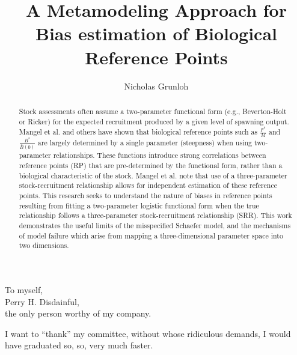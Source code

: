 \documentclass[12pt]{ucscthesis}
\title{A Metamodeling Approach for Bias estimation of Biological Reference Points}
\author{Nicholas Grunloh}
\begin{document}
%
\begin{frontmatter}

%
\maketitle
\copyrightpage
%
\tableofcontents
\listoffigures

%
\begin{abstract}
Stock assessments often assume a two-parameter functional form
(e.g., Beverton-Holt or Ricker) for the expected recruitment produced by a
given level of spawning output. Mangel et al. \cite{mangel_perspective_2013} %
and others have shown that biological reference points such as $\frac{F^*}{M}$
and $\frac{B^*}{\bar{B}(0)}$ are largely determined by a single parameter
(steepness) when using two-parameter relationships. These functions introduce
strong correlations between reference points (RP) that are pre-determined by
the functional form, rather than a biological characteristic of the stock.
Mangel et al. note that use of a three-parameter stock-recruitment
relationship allows for independent estimation of these reference points. This
research seeks to understand the nature of biases in reference points
resulting from fitting a two-parameter logistic functional form when the true
relationship follows a three-parameter stock-recruitment relationship (SRR). This  %
work demonstrates the useful limits of the misspecified Schaefer model, and
the mechanisms of model failure which arise from mapping a three-dimensional
parameter space into two dimensions.
\end{abstract}

%
\begin{dedication}
\null\vfil
{\large \color{red}
\begin{center}
To myself,\\\vspace{12pt}
Perry H. Disdainful,\\\vspace{12pt}
the only person worthy of my company.
\end{center}}
\vfil\null
\end{dedication}

%
\begin{acknowledgements}
\color{red}
I want to ``thank'' my committee, without whose ridiculous demands, I
would have graduated so, so, very much faster.
\end{acknowledgements}

\end{frontmatter}
\end{document}

